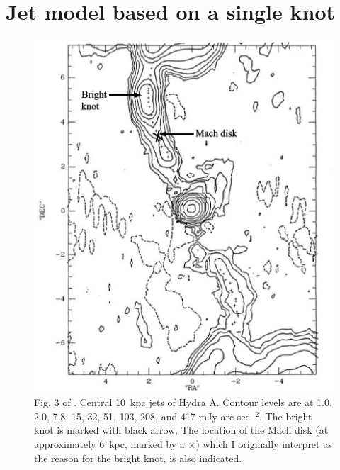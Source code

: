 \chapter{Jet model based on a single knot}\label{chapter4}
\begin{figure}
\centering
\includegraphics[width=\linewidth]{tp.eps}
\caption{Fig. 3 of \citet{taylor90}. Central 10~kpc jets of Hydra A. Contour levels are at 1.0, 2.0, 7.8, 15, 32, 51, 103, 208, and 417 mJy arc sec$^{-2}$. The bright knot is marked with black arrow. The location of the Mach disk (at approximately 6~kpc, marked by a $\times$) which I originally interpret as the reason for the bright knot, is also indicated.}
\label{f:morph}
\end{figure}

